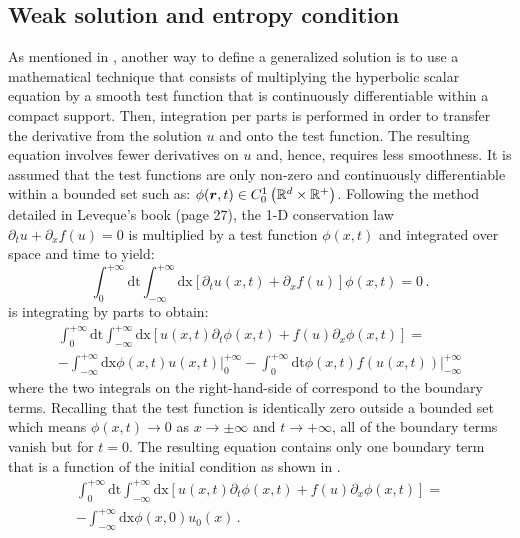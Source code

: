 \subsection{Weak solution and entropy condition}\label{weak_sct1b}
As mentioned in , another way to define a generalized solution is to use a mathematical technique that consists of multiplying the hyperbolic scalar equation by a smooth test function that is continuously differentiable within a compact support. Then, integration per parts is performed in order to transfer the derivative from the solution $u$ and onto the test function. The resulting equation involves fewer derivatives on $u$ and, hence, requires less smoothness. It is assumed that the test functions are only non-zero and continuously differentiable within a bounded set such as: $\phi(\boldsymbol r,t) \in C_0^1 \left( \mathbb{R}^d \times \mathbb{R^+} \right)$. 
Following the method detailed in Leveque's book \cite{Leveque} (page 27), the 1-D conservation law $\partial_t u + \partial_x f(u) = 0$ is multiplied by a test function $\phi(x,t)$ and integrated over space and time to yield:
%
\begin{equation}\label{eq:weak_sol_sct1b}
\int_0^{+\infty}\text{dt}\int_{-\infty}^{+\infty}\text{dx} \left[ \partial_t u(x,t) + \partial_x f(u) \right] \phi(x,t) = 0 \,.
\end{equation}
% 
 is integrating by parts to obtain:
%
\begin{eqnarray}\label{eq:weak_sol2_sct1b}
\int_0^{+\infty}\text{dt}\int_{-\infty}^{+\infty}\text{dx} \left[ u(x,t) \partial_t \phi(x,t)   + f(u) \partial_x \phi(x,t)  \right] = \nonumber \\
-\int_{-\infty}^{+\infty}\text{dx} \phi(x,t) u(x,t) \left. \right|_0^{+\infty} - \int_0^{+\infty}\text{dt} \phi(x,t) f(u(x,t)) \left. \right|_{-\infty}^{+\infty}
\end{eqnarray}
%
where the two integrals on the right-hand-side of  correspond to the boundary terms. Recalling that the test function is identically zero outside a bounded set which means $\phi(x,t) \to 0$ as $x \to \pm  \infty$ and $t \to +\infty$, all of the boundary terms vanish but for $t=0$. The resulting equation contains only one boundary term that is a function of the initial condition as shown in .
%
\begin{eqnarray}\label{eq:weak_sol3_sct1b}
\int_0^{+\infty}\text{dt}\int_{-\infty}^{+\infty}\text{dx} \left[ u(x,t) \partial_t \phi(x,t)   + f(u) \partial_x \phi(x,t)  \right] = \nonumber \\
-\int_{-\infty}^{+\infty}\text{dx} \phi(x,0) u_0(x) \,.
\end{eqnarray}
